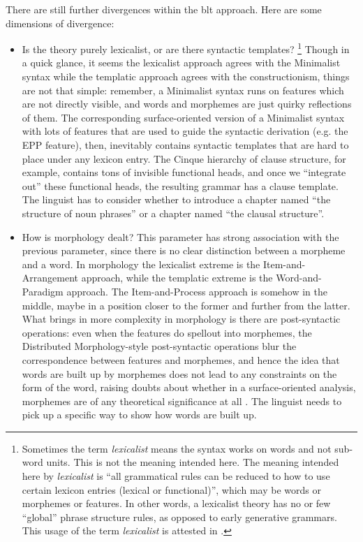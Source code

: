 \documentclass{article}
\newcommand*{\term}[1]{\emph{#1}}
\begin{document}
There are still further divergences within the \ac{blt} approach.
Here are some dimensions of divergence:
\begin{itemize}
    \item Is the theory purely lexicalist, 
    or are there syntactic templates?%
    \footnote{
        Sometimes the term \term{lexicalist} means the syntax works on words 
        and not sub-word units.
        This is not the meaning intended here. 
        The meaning intended here by \term{lexicalist} is 
        ``all grammatical rules can be reduced to how to use certain lexicon entries (lexical or functional)'',
        which may be words or morphemes or features.
        In other words, a lexicalist theory has no or few ``global'' phrase structure rules,
        as opposed to early generative grammars.
        This usage of the term \term{lexicalist} is attested in \citet{matchin2020cortical}. 
    }
    Though in a quick glance, it seems the lexicalist approach agrees with the Minimalist syntax 
    while the templatic approach agrees with the constructionism,
    things are not that simple:
    remember, a Minimalist syntax runs on features which are not directly visible,
    and words and morphemes are just quirky reflections of them.
    The corresponding surface-oriented version of a Minimalist syntax with lots of features 
    that are used to guide the syntactic derivation (e.g. the EPP feature), then,
    inevitably contains syntactic templates that are hard to place under any lexicon entry.
    The Cinque hierarchy of clause structure, for example, contains tons of invisible functional heads,
    and once we ``integrate out'' these functional heads,
    the resulting grammar has a clause template.
    The linguist has to consider whether to introduce 
    a chapter named ``the structure of noun phrases''
    or a chapter named ``the clausal structure''.

    \item How is morphology dealt?
    This parameter has strong association with the previous parameter, 
    since there is no clear distinction between a morpheme and a word.
    In morphology the lexicalist extreme is the Item-and-Arrangement approach,
    while the templatic extreme is the Word-and-Paradigm approach.
    The Item-and-Process approach is somehow in the middle, 
    maybe in a position closer to the former and further from the latter. 
    What brings in more complexity in morphology is 
    there are post-syntactic operations:
    even when the features do spellout into morphemes,
    the Distributed Morphology-style post-syntactic operations 
    blur the correspondence between features and morphemes,
    and hence the idea that words are built up by morphemes 
    does not lead to any constraints on the form of the word,
    raising doubts about whether in a surface-oriented analysis,
    morphemes are of any theoretical significance at all \citep{anderson2017words}.
    The linguist needs to pick up a specific way to show how words are built up.


\end{itemize}
\end{document}
